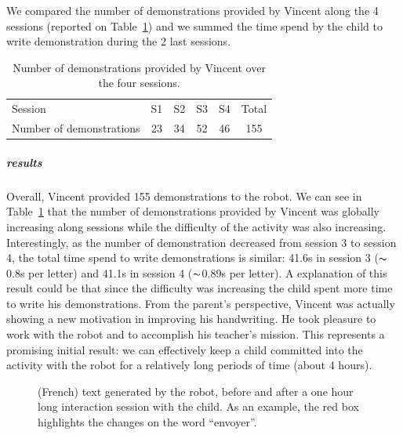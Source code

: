 \documentclass[10pt,a4paper]{article}
\begin{document}
We compared the number of demonstrations provided by Vincent along the 4 sessions (reported on Table~\ref{table:vincent_sess}) and we summed the time spend by the child to write demonstration during the 2 last sessions.
\begin{table}[!]
    \centering
    \caption{\footnotesize Number of demonstrations provided by Vincent over the four sessions.}
    \begin{tabular}{lccccc}
        \toprule
        Session & S1 & S2 & S3 & S4 & Total\\ 
        Number of demonstrations & 23 & 34 & 52 & 46 & 155\\ 
        \bottomrule

    \end{tabular}
    \label{table:vincent_sess}
\end{table}
\subparagraph{results}
Overall, Vincent provided 155 demonstrations to the robot. We can see in Table~\ref{table:vincent_sess} that the number of demonstrations provided by Vincent was globally increasing along sessions while the difficulty of the activity was also increasing. Interestingly, as the number of demonstration decreased from session 3 to session 4, the total time spend to write demonstrations is similar: 41.6s in session 3 ($\thicksim$0.8s per letter) and 41.1s in session 4 ($\thicksim$0.89s per letter). A explanation of this result could be that since the difficulty was increasing the child spent more time to write his demonstrations. From the parent's perspective, Vincent was actually showing a new motivation in improving his handwriting. He took pleasure to work with the robot and to accomplish his teacher's mission. This represents a promising initial
result: we can effectively keep a child committed into the activity with the robot for a relatively
long periods of time (about 4 hours).


\begin{figure}
    \centering

    \caption{\small (French) text generated by the robot, before and after a one
        hour long interaction session with the child. As an example, the red box
        highlights the changes on the word ``envoyer''.}

    \label{fig:stimuli}
\end{figure}
\end{document}

